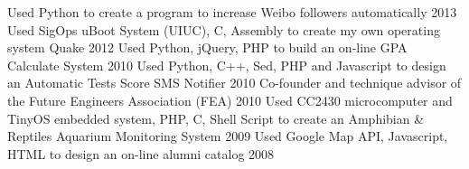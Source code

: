 \begin{cvhonors}
  \cvhonorn
    {Used Python to create a program to increase Weibo followers automatically}
    {}
    {}
    {2013}
  \cvhonorn
    {Used SigOps uBoot System (UIUC), C, Assembly to create my own operating system \textquotesingle Quake\textquotesingle }
    {}
    {}
    {2012}
  \cvhonorn
    {Used Python, jQuery, PHP to build an on-line GPA Calculate System}
    {}
    {}
    {2010}
  \cvhonorn
    {Used Python, C++, Sed, PHP and Javascript to design an Automatic Tests Score SMS Notifier}
    {}
    {}
    {2010}
              \cvhonorn
    {Co-founder and technique advisor of the Future Engineers Association (FEA) }
    {}
    {}
    {2010}
      \cvhonorn
    {Used CC2430 microcomputer and TinyOS embedded system, PHP, C, Shell Script to create an Amphibian \& Reptiles Aquarium Monitoring System}
    {}
    {}
    {2009}
      \cvhonorn
    {Used Google Map API, Javascript, HTML to design an on-line alumni catalog}
    {}
    {}
    {2008}

\end{cvhonors}
